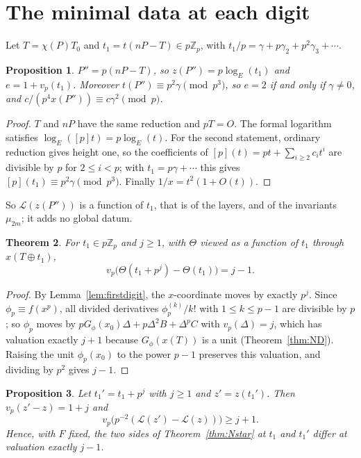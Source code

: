 \documentclass[11pt,a4paper]{amsart}
\newcommand{\Zp}{\mathbb{Z}_p}
\newcommand{\cL}{\mathcal{L}}
\theoremstyle{plain}
\newtheorem{theorem}{Theorem}[section]
\newtheorem{proposition}[theorem]{Proposition}
\theoremstyle{definition}
\theoremstyle{remark}
\begin{document}
\section{The minimal data at each digit}\label{sec:minimal}

Let $T=\chi(P)T_0$ and $t_1=t(nP-T)\in p\Zp$, with $t_1/p=\gamma+p\gamma_2+p^2\gamma_3+\cdots$.

\begin{proposition}\label{prop:layer}
$P''=p(nP-T)$, so $z(P'')=p\log_E(t_1)$ and $e=1+v_p(t_1)$. Moreover $t(P'')\equiv p^2\gamma\pmod{p^3}$, so $e=2$ if and only if $\gamma\ne0$, and $c/(p^4x(P''))\equiv c\gamma^2\pmod p$.
\end{proposition}

\begin{proof}
$T$ and $nP$ have the same reduction and $pT=O$. The formal logarithm satisfies $\log_E([p]t)=p\log_E(t)$. For the second statement, ordinary reduction gives height one, so the coefficients of $[p](t)=pt+\sum_{i\ge2}c_it^i$ are divisible by $p$ for $2\le i<p$; with $t_1=p\gamma+\cdots$ this gives $[p](t_1)\equiv p^2\gamma\pmod{p^3}$. Finally $1/x=t^2(1+O(t))$.
\end{proof}

So $\cL(z(P''))$ is a function of $t_1$, that is of the layers, and of the invariants $\mu_{2m}$; it adds no global datum.

\begin{theorem}\label{thm:Gprime}
For $t_1\in p\Zp$ and $j\ge1$, with $\Theta$ viewed as a function of $t_1$ through $x(T\oplus t_1)$,
\[
v_p\bigl(\Theta(t_1+p^j)-\Theta(t_1)\bigr)=j-1 .
\]
\end{theorem}

\begin{proof}
By Lemma~\ref{lem:firstdigit}, the $x$-coordinate moves by exactly $p^j$. Since $\phi_p\equiv f(x^p)$, all divided derivatives $\phi_p^{(k)}/k!$ with $1\le k\le p-1$ are divisible by $p$; so $\phi_p$ moves by $pG_\phi(x_0)\Delta+p\Delta^2B+\Delta^pC$ with $v_p(\Delta)=j$, which has valuation exactly $j+1$ because $G_\phi(x(T))$ is a unit (Theorem~\ref{thm:ND}). Raising the unit $\phi_p(x_0)$ to the power $p-1$ preserves this valuation, and dividing by $p^2$ gives $j-1$.
\end{proof}

\begin{proposition}\label{prop:rates}
Let $t_1'=t_1+p^j$ with $j\ge1$ and $z'=z(t_1')$. Then $v_p(z'-z)=1+j$ and
\[
v_p\bigl(p^{-2}(\cL(z')-\cL(z))\bigr)\ge j+1 .
\]
Hence, with $F$ fixed, the two sides of Theorem~\ref{thm:Nstar} at $t_1$ and $t_1'$ differ at valuation exactly $j-1$.
\end{proposition}
\end{document}
